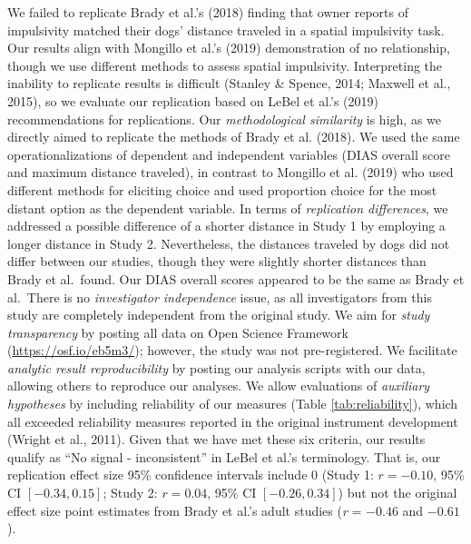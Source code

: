 \documentclass[
  pub,floatsintext]{apa6}
\begin{document}
We failed to replicate Brady et al.'s (2018) finding that owner reports of impulsivity matched their dogs' distance traveled in a spatial impulsivity task. Our results align with Mongillo et al.'s (2019) demonstration of no relationship, though we use different methods to assess spatial impulsivity. Interpreting the inability to replicate results is difficult (Stanley \& Spence, 2014; Maxwell et al., 2015), so we evaluate our replication based on LeBel et al.'s (2019) recommendations for replications. Our \emph{methodological similarity} is high, as we directly aimed to replicate the methods of Brady et al. (2018). We used the same operationalizations of dependent and independent variables (DIAS overall score and maximum distance traveled), in contrast to Mongillo et al. (2019) who used different methods for eliciting choice and used proportion choice for the most distant option as the dependent variable. In terms of \emph{replication differences}, we addressed a possible difference of a shorter distance in Study 1 by employing a longer distance in Study 2. Nevertheless, the distances traveled by dogs did not differ between our studies, though they were slightly shorter distances than Brady et al.~found. Our DIAS overall scores appeared to be the same as Brady et al.~There is no \emph{investigator independence} issue, as all investigators from this study are completely independent from the original study. We aim for \emph{study transparency} by posting all data on Open Science Framework (\url{https://osf.io/eb5m3/}); however, the study was not pre-registered. We facilitate \emph{analytic result reproducibility} by posting our analysis scripts with our data, allowing others to reproduce our analyses. We allow evaluations of \emph{auxiliary hypotheses} by including reliability of our measures (Table \ref{tab:reliability}), which all exceeded reliability measures reported in the original instrument development (Wright et al., 2011). Given that we have met these six criteria, our results qualify as ``No signal - inconsistent'' in LeBel et al.'s terminology. That is, our replication effect size 95\% confidence intervals include 0 (Study 1: \(r = -0.10\), 95\% CI \([-0.34, 0.15]\); Study 2: \(r = 0.04\), 95\% CI \([-0.26, 0.34]\)) but not the original effect size point estimates from Brady et al.'s adult studies (\emph{r} = \(-0.46\) and \(-0.61\)).
\end{document}
